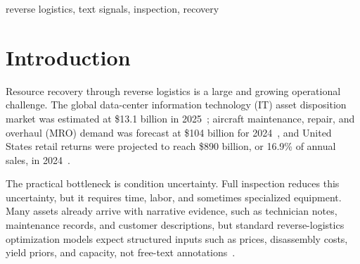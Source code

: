\documentclass[a4paper,conference]{IEEEtran}
\begin{document}
\begin{abstract}
Reverse-logistics operators often decide how to inspect and route returned assets
before their condition is fully observed, while full inspection consumes scarce
labor. Semantic Signal-Assisted Decision Support converts return notes into a
condition factor and a signal-quality score that guide inspection depth and
recovery allocation under shared labor capacity. We evaluate the framework in
three synthetic benchmark scenarios spanning information technology decommissioning,
aircraft maintenance, and consumer-electronics returns. Across 30 paired simulation
seeds, the no-signal / no-inspection comparator records higher total recovery value
than the keyword implementation in all three scenarios under the benchmark's purely
economic objective. The keyword implementation nevertheless outperforms a
structured-feature comparator with noisy full inspection while reducing inspection
cost in all three scenarios. At matched
inspection cost, score-guided targeting
adds 53.9 thousand United States dollars per batch in the aircraft scenario but has
little economic effect in the other two configurations; phrase and large language
model extractors provide further gains in the aircraft scenario. These results show
how narrative evidence can support inspection allocation before recovery decisions
are made.
\end{abstract}

\begin{IEEEkeywords}
reverse logistics, text signals, inspection, recovery
\end{IEEEkeywords}


\section{Introduction}\label{sec:intro}

Resource recovery through reverse logistics is a large and growing operational
challenge. The global data-center information technology (IT) asset disposition market was estimated at \$13.1 billion in
2025~\cite{GlobalMktInsights}; aircraft maintenance, repair, and overhaul (MRO)
demand was forecast at \$104 billion for 2024~\cite{OliverWyman}, and United States
retail returns were projected to reach \$890 billion, or 16.9\% of annual sales, in 2024~\cite{NRF}.

The practical bottleneck is condition uncertainty. Full inspection reduces this
uncertainty, but it requires time, labor, and sometimes specialized equipment. Many
assets already arrive with narrative evidence, such as technician notes, maintenance
records, and customer descriptions, but standard reverse-logistics optimization
models expect structured inputs such as prices, disassembly costs, yield priors,
and capacity, not free-text annotations~\cite{Slama2022,Govindan2015,Sun2024}.
\end{document}
